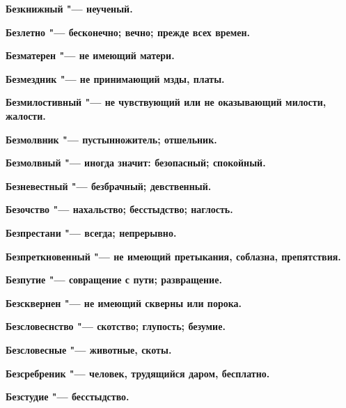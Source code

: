 \begin{mymulticols}{2}
\bfseries Безкнижный\normalfont{} "--- неученый. 




\bfseries Безлетно\normalfont{} "--- бесконечно; вечно; прежде всех времен. 




\bfseries Безматерен\normalfont{} "--- не имеющий матери. 




\bfseries Безмездник\normalfont{} "--- не принимающий мзды, платы. 




\bfseries Безмилостивный\normalfont{} "--- не чувствующий или не оказывающий милости, жалости. 




\bfseries Безмолвник\normalfont{} "--- пустынножитель; отшельник. 




\bfseries Безмолвный\normalfont{} "--- иногда значит: безопасный; спокойный. 




\bfseries Безневестный\normalfont{} "--- безбрачный; девственный. 




\bfseries Безочство\normalfont{} "--- нахальство; бесстыдство; наглость. 




\bfseries Безпрестани\normalfont{} "--- всегда; непрерывно. 




\bfseries Безпреткновенный\normalfont{} "--- не имеющий претыкания, соблазна, препятствия. 




\bfseries Безпутие\normalfont{} "--- совращение с пути; развращение. 




\bfseries Безсквернен\normalfont{} "--- не имеющий скверны или порока. 




\bfseries Безсловеснство\normalfont{} "--- скотство; глупость; безумие. 




\bfseries Безсловесные\normalfont{} "--- животные, скоты. 




\bfseries Безсребреник\normalfont{} "--- человек, трудящийся даром, бесплатно. 




\bfseries Безстудие\normalfont{} "--- бесстыдство. 





\end{mymulticols}
